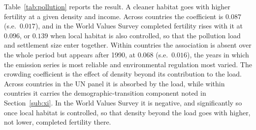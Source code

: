 \documentclass[11pt]{article}
\begin{document}
Table~\ref{tab:pollution} reports the result. A cleaner habitat goes with higher fertility at a given
density and income. Across countries the coefficient is $0.087$ (s.e.\ $0.017$), and in the World
Values Survey completed fertility rises with it at $0.096$, or $0.139$ when local habitat is also
controlled, so that the pollution load and settlement size enter together. Within countries the
association is absent over the whole period but appears after 1990, at $0.068$ (s.e.\ $0.016$), the
years in which the emission series is most reliable and environmental regulation most varied. The
crowding coefficient is the effect of density beyond its contribution to the load. Across countries in
the UN panel it is absorbed by the load, while within countries it carries the demographic-transition
component noted in Section~\ref{sub:xi}. In the World Values Survey it is negative, and significantly so
once local habitat is controlled, so that density beyond the load goes with higher, not lower,
completed fertility there.
\end{document}
